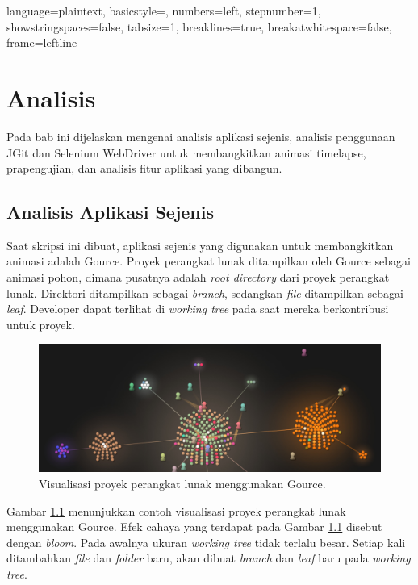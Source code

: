 
\lstset
{ 
    language=plaintext,
    basicstyle=\footnotesize,
    numbers=left,
    stepnumber=1,
    showstringspaces=false,
    tabsize=1,
    breaklines=true,
    breakatwhitespace=false,
    frame=leftline
}

\chapter{Analisis}
\label{chap:analisis}
Pada bab ini dijelaskan mengenai analisis aplikasi sejenis, analisis penggunaan JGit dan Selenium WebDriver untuk membangkitkan animasi timelapse, prapengujian, dan analisis fitur aplikasi yang dibangun. 

\section{Analisis Aplikasi Sejenis}
\label{sec:analisis_aplikasi_sejenis}
Saat skripsi ini dibuat, aplikasi sejenis yang digunakan untuk membangkitkan animasi adalah Gource.  
Proyek perangkat lunak ditampilkan oleh Gource sebagai animasi pohon, dimana pusatnya adalah \textit{root directory} dari proyek perangkat lunak\cite{Gource}. Direktori ditampilkan sebagai \textit{branch}, sedangkan \textit{file} ditampilkan sebagai \textit{leaf}. Developer dapat terlihat di \textit{working tree} pada saat mereka berkontribusi untuk proyek.

\begin{figure}[H]
	\centering
		\includegraphics[scale=0.2]{Gambar/gource.jpg}
	\caption{Visualisasi proyek perangkat lunak menggunakan Gource.}
	\label{fig:gource}
\end{figure}

Gambar \ref{fig:gource} menunjukkan contoh visualisasi proyek perangkat lunak menggunakan Gource. Efek cahaya yang terdapat pada Gambar \ref{fig:gource} disebut dengan \textit{bloom}. Pada awalnya ukuran \textit{working tree} tidak terlalu besar. Setiap kali ditambahkan \textit{file} dan \textit{folder} baru, akan dibuat \textit{branch} dan \textit{leaf} baru pada \textit{working tree}.  

